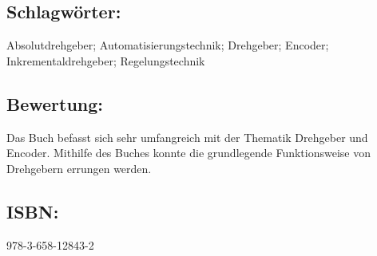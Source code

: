\subsection*{Schlagwörter:}
Absolutdrehgeber; Automatisierungstechnik; Drehgeber; Encoder; Inkrementaldrehgeber; Regelungstechnik
\subsection*{Bewertung:}
Das Buch befasst sich sehr umfangreich mit der Thematik Drehgeber und Encoder. Mithilfe des Buches konnte die grundlegende Funktionsweise von Drehgebern errungen werden.
\subsection*{ISBN:}
978-3-658-12843-2


